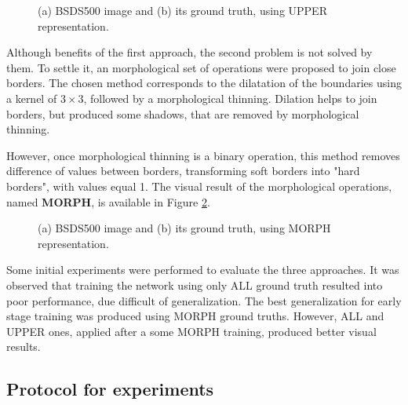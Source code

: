 \begin{figure}
  \centering
  \caption{(a) BSDS500 image and (b) its ground truth, using UPPER representation.}
  \hfill
  \sourceOwn
  \label{fig:cap6_bsds_upper}
\end{figure}

Although benefits of the first approach, the second problem is not solved by them.
To settle it, an morphological set of operations were proposed to join close borders.
The chosen method corresponds to the dilatation of the boundaries using a kernel of $3 \times 3$, followed by a morphological thinning.
Dilation helps to join borders, but produced some shadows, that are removed by morphological thinning.

However, once morphological thinning is a binary operation, this method removes difference of values between borders, transforming soft borders into "hard borders", with values equal 1. 
The visual result of the morphological operations, named \textbf{MORPH}, is available in Figure \ref{fig:cap6_bsds_morf}.

\begin{figure}
  \centering
  \caption{(a) BSDS500 image and (b) its ground truth, using MORPH representation.}
  \hfill
  \sourceOwn
  \label{fig:cap6_bsds_morf}
\end{figure}

Some initial experiments were performed to evaluate the three approaches.
It was observed that training the network using only ALL ground truth resulted into poor performance, due difficult of generalization.
The best generalization for early stage training was produced using MORPH ground truths.
However, ALL and UPPER ones, applied after a some MORPH training, produced better visual results.

\subsection{Protocol for experiments}
\label{ssec:framework_experiments}

